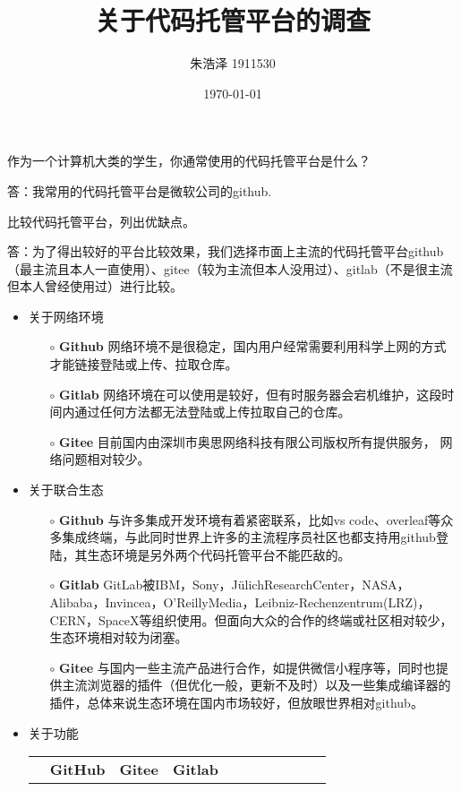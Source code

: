 \documentclass{homework}
\author{朱浩泽 1911530}
\date{\today}
\title{\Large{关于代码托管平台的调查}}
\begin{document}
 \maketitle

\question \large{作为一个计算机大类的学生，你通常使用的代码托管平台是什么？}

\normalsize{答：我常用的代码托管平台是微软公司的github.}

\question \large{比较代码托管平台，列出优缺点。}
\normalsize

答：为了得出较好的平台比较效果，我们选择市面上主流的代码托管平台github（最主流且本人一直使用）、gitee（较为主流但本人没用过）、gitlab（不是很主流但本人曾经使用过）进行比较。
\begin{itemize}
	\item 关于网络环境
		\begin{itemize}
			\item[$\circ$] \textbf{Github}  网络环境不是很稳定，国内用户经常需要利用科学上网的方式才能链接登陆或上传、拉取仓库。
			\item[$\circ$] \textbf{Gitlab}  网络环境在可以使用是较好，但有时服务器会宕机维护，这段时间内通过任何方法都无法登陆或上传拉取自己的仓库。
			\item[$\circ$] \textbf{Gitee}  目前国内由深圳市奥思网络科技有限公司版权所有提供服务， 网络问题相对较少。
		\end{itemize}
	\item 关于联合生态 
		\begin{itemize}
			\item[$\circ$] \textbf{Github}  与许多集成开发环境有着紧密联系，比如vs code、overleaf等众多集成终端，与此同时世界上许多的主流程序员社区也都支持用github登陆，其生态环境是另外两个代码托管平台不能匹敌的。
			\item[$\circ$] \textbf{Gitlab}  GitLab被IBM，Sony，JülichResearchCenter，NASA，Alibaba，Invincea，O’ReillyMedia，Leibniz-Rechenzentrum(LRZ)，CERN，SpaceX等组织使用。但面向大众的合作的终端或社区相对较少，生态环境相对较为闭塞。
			\item[$\circ$] \textbf{Gitee}   与国内一些主流产品进行合作，如提供微信小程序等，同时也提供主流浏览器的插件（但优化一般，更新不及时）以及一些集成编译器的插件，总体来说生态环境在国内市场较好，但放眼世界相对github。 
		\end{itemize} 
	\item 关于功能
		\begin{table}[!htbp]
			\centering
			\begin{tabular}{ccccccccccc}
			\toprule  
			& \textbf{GitHub}& \textbf{Gitee}& \textbf{Gitlab}\\

\end{tabular}
\end{table}
\end{itemize}
\end{document}
